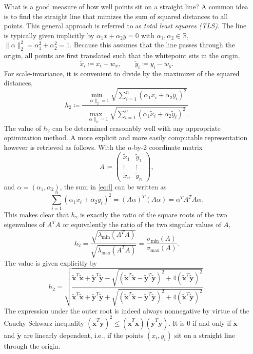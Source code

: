 \documentclass{scrartcl}
\theoremstyle{named}
\newcommand\R{\ensuremath{\mathbb{R}}}
\newcommand\xt{\ensuremath{\bm{\tilde{x}}}}
\newcommand\yt{\ensuremath{\bm{\tilde{y}}}}
\begin{document}
What is a good measure of how well points sit on a straight line?
A common idea is to find the straight line that mimizes the sum of squared distances to
all points. This general approach is referred to as \emph{total least squares (TLS)}.
The line is typically
given implicitly by $\alpha_1 x + \alpha_2 y
= 0$ with $\alpha_1,\alpha_2\in\R$, $\|\alpha\|_2^2 = \alpha_1^2 + \alpha_2^2 = 1$.
Because this assumes that the line passes through the origin, all points are
first translated such that the whitepoint sits in the origin,
\[
  \tilde{x}_i \coloneqq x_i-w_x,\qquad
  \tilde{y}_i \coloneqq y_i-w_y.
\]
For scale-invariance, it is convenient to divide by the maximizer of the squared
distances,
\begin{equation}\label{eq:l}
h_2 \coloneqq
  \frac{
\min_{\|\alpha\|_2=1}
  \sqrt{\sum_{i=1}^n (\alpha_1 \tilde{x}_i + \alpha_2 \tilde{y}_i)^2}
}{
\max_{\|\alpha\|_2=1}
  \sqrt{\sum_{i=1}^n (\alpha_1 \tilde{x}_i + \alpha_2 \tilde{y}_i)^2}.
}
\end{equation}
The value of $h_2$ can be determined reasonably well with any appropriate optimization
method. A more explicit and more easily computable representation however is retrieved
as follows.  With the $n$-by-2 coordinate matrix
\[
  A \coloneqq \begin{pmatrix}
    \tilde{x}_1 & \tilde{y}_1\\
    \vdots & \vdots\\
    \tilde{x}_n & \tilde{y}_n
  \end{pmatrix},
\]
and $\alpha=(\alpha_1, \alpha_2)$, the sum in \eqref{eq:l} can be written as
\[
  \sum_{i=1}^n (\alpha_1 \tilde{x}_i + \alpha_2 \tilde{y}_i)^2
  = (A \alpha)^T (A \alpha)
  = \alpha^T A^T A \alpha.
\]
This makes clear that $h_2$ is exactly the ratio of the square roots of the two
eigenvalues of $A^TA$ or equivalently the ratio of the two singular values of $A$,
\[
h_2
= \frac{
  \sqrt{\lambda_{\min}(A^T A)}
  }{
    \sqrt{\lambda_{\max}(A^T A)}
  }
= \frac{\sigma_{\min}(A)}{\sigma_{\max}(A)}.
\]
The value is given explicitly by
\begin{equation*}
  h_2 = \sqrt{
    \frac{
      \xt^T\xt
      + \yt^T\yt
      - \sqrt{(\xt^T\xt - \yt^T\yt)^2 + 4 (\xt^T\yt)^2}
    }{
      \xt^T\xt
      + \yt^T\yt
      + \sqrt{(\xt^T\xt - \yt^T\yt)^2 + 4 (\xt^T\yt)^2}
    }
    }.
\end{equation*}
The expression under the outer root is indeed always nonnegative by virtue of the
Cauchy-Schwarz inequality $(\xt^T\yt)^2 \le (\xt^T\xt) (\yt^T\yt)$. It is 0 if and only
if $\xt$ and $\yt$ are linearly dependent, i.e., if the points $(x_i, y_i)$ sit on a
straight line through the origin.
\end{document}
